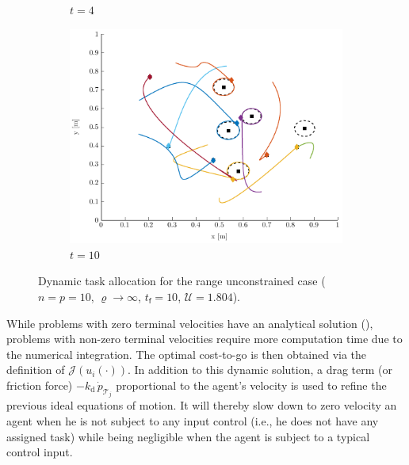 \documentclass{ifacconf}
\newcommand{\f}{{\mathsf{f}}}
\newcommand{\cJ}{\mathcal{J}}
\newcommand{\cT}{\mathcal{T}}
\newcommand{\cU}{\mathcal{U}}
\begin{document}
\begin{figure}[h]
\begin{subfigure}{\linewidth}
  \caption{$t=4$}
  \label{fig:ExUC_Im2}
\end{subfigure}
\begin{subfigure}{\linewidth}
  \centering
  \includegraphics[width=0.8\linewidth]{Figures/Alloc_5_5_t_10_CommLimit_0.pdf}
  \caption{$t=10$}
  \label{fig:ExUC_Im3}
\end{subfigure}
\caption{Dynamic task allocation for the range unconstrained case ($n=p=10$, $\varrho \rightarrow \infty$, $t_\f=10$, $\cU=1.804$).}
\label{fig:RHTAUNC}
\end{figure}

While problems with zero terminal velocities have an analytical solution (\cite{p:bakolas2014}), problems with non-zero terminal velocities require more computation time due to the numerical integration.
The optimal cost-to-go is then obtained via the definition of $\cJ(u_i(\cdot))$.
In addition to this dynamic solution, a drag term (or friction force) $-k_\mathrm{d}\,\dot{p}_{\cT_j}$ proportional to the agent's velocity is used to refine the previous ideal equations of motion. It will thereby slow down to zero velocity an agent when he is not subject to any input control (i.e., he does not have any assigned task) while being negligible when the agent is subject to a typical control input.
\end{document}
